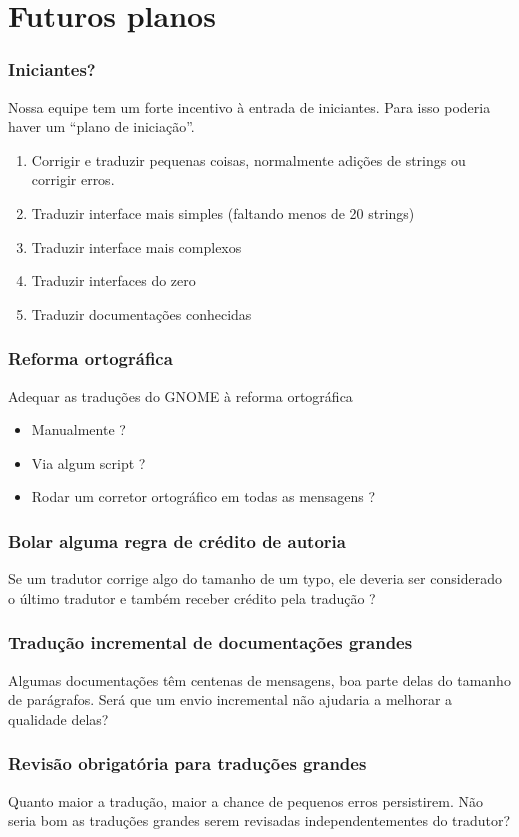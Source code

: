 \documentclass{beamer}
\begin{document}
\section{Futuros planos}

\begin{frame}
    \frametitle{Iniciantes?}
    Nossa equipe tem um forte incentivo à entrada de iniciantes. Para isso poderia haver um ``plano de iniciação''.
    \begin{enumerate}
        \item Corrigir e traduzir pequenas coisas, normalmente adições de strings ou corrigir erros. 
        \item Traduzir interface mais simples (faltando menos de 20 strings)
        \item Traduzir interface mais complexos 
        \item Traduzir interfaces do zero
        \item Traduzir documentações conhecidas
    \end{enumerate}
\end{frame}

\begin{frame}
    \frametitle{Reforma ortográfica}

    Adequar as traduções do GNOME à reforma ortográfica
    \begin{itemize}[<+->]
        \item Manualmente ? 
        \item Via algum script ?
        \item Rodar um corretor ortográfico em todas as mensagens ?  
    \end{itemize}
\end{frame}

\begin{frame}
    \frametitle{Bolar alguma regra de crédito de autoria}
    Se um tradutor corrige algo do tamanho de um typo, ele deveria ser considerado o último tradutor e também receber crédito pela tradução ? 
\end{frame}

\begin{frame}
    \frametitle{Tradução incremental de documentações grandes}
    Algumas documentações têm centenas de mensagens, boa parte delas do tamanho de parágrafos. 
    Será que um envio incremental não ajudaria a melhorar a qualidade delas?
\end{frame}

\begin{frame}
    \frametitle{Revisão obrigatória para traduções grandes}
    Quanto maior a tradução, maior a chance de pequenos erros persistirem. 
    Não seria bom as traduções grandes serem revisadas independentementes do tradutor?
\end{frame}
\end{document}
